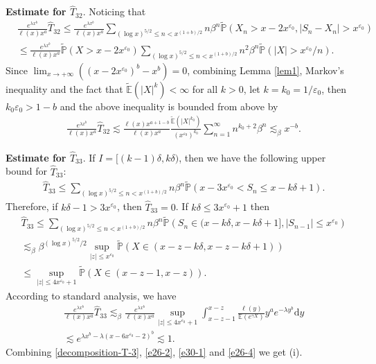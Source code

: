 \documentclass[11pt]{article}
\numberwithin{equation}{section}
\begin{document}
\noindent
{\bf Estimate for $\widehat{T}_{32}$}.  Noticing that 
\begin{align}
	&  \frac{e^{\lambda x^b}}{\ell(x)x^a } \widehat{T}_{32}   \leq \frac{e^{\lambda x^b}}{\ell(x)x^a } \sum_{(\log x)^{5/2}\leq n<x^{(1+b)/2}}  n \beta^{n}\widetilde{\mathbb{P}}\left(X_n > x-2x^{\varepsilon_0}, |S_n-X_n|>x^{\varepsilon_0}\right) \nonumber\\
	& \leq \frac{e^{\lambda x^b}}{\ell(x)x^a } \widetilde{\mathbb{P}}(X>x-2x^{\varepsilon_0}) \sum_{(\log x)^{5/2}\leq n<x^{(1+b)/2}}  n^2 \beta^{n} \widetilde{\mathbb{P}}(|X|>x^{\varepsilon_0}/n).
\end{align}
Since $\lim_{x\to+\infty} ((x-2x^{\varepsilon_0})^b-x^b)=0$, combining Lemma \ref{lem1}, Markov's inequality and the fact that $\widetilde{\mathbb{E}}(|X|^k)<\infty$ for all $k>0$,  let $k=k_0=1/\varepsilon_0$, then $k_0 \varepsilon_0 >1-b$ and the above inequality is bounded from above by
\begin{align}\label{e30-1}
	& \frac{e^{\lambda x^b}}{\ell(x)x^a } \widehat{T}_{32} \lesssim  \frac{\ell(x) x^{a+1-b}}{\ell(x)x^a } \frac{\widetilde{\mathbb{E}}(|X|^{k_0})}{(x^{\varepsilon_0})^{k_0}} \sum_{n=1}^\infty n^{k_0+2} \beta^n \lesssim_\beta  x^{-b}.
\end{align}

\noindent
{\bf Estimate for $\widehat{T}_{33}$}.
If $I=[(k-1)\delta, k\delta)$, then we have the following upper bound for $\widehat{T}_{33}$:
\begin{align}\label{e27-2}
	&  \widehat{T}_{33} \leq   \sum_{(\log x)^{5/2}\leq n<x^{(1+b)/2}}  n \beta^{n} \widetilde{\mathbb{P}}\left(x-3x^{\varepsilon_0}<S_n\leq x-k\delta+1 \right).
\end{align}
Therefore, if $k\delta-1 >3x^{\varepsilon_0}$, then $\widehat{T}_{33} =0$.  If $k\delta\leq 3x^{\varepsilon_0}+1$ then
\begin{align}
	&  \widehat{T}_{33} \leq     \sum_{(\log x)^{5/2}\leq n<x^{(1+b)/2}}  n \beta^{n} \widetilde{\mathbb{P}}\left(S_n\in (x-k\delta, x-k\delta+1],   |S_{n-1}|\leq x^{\varepsilon_0}\right)\nonumber\\
	& \lesssim_\beta   \beta^{(\log x)^{5/2}/2}   \sup_{|z| \leq x^{\varepsilon_0} } \widetilde{\mathbb{P}}(X\in (x-z-k\delta, x-z-k\delta+1))   \nonumber\\
	&\leq \sup_{|z|\leq 4x^{\varepsilon_0} +1} \widetilde{\mathbb{P}}(X\in (x-z-1, x-z)) .
\end{align}
According to standard analysis, we have 
\begin{align}\label{e26-4}
	& \frac{e^{\lambda x^b}}{\ell(x)x^a } \widehat{T}_{33} \lesssim_\beta   \frac{e^{\lambda x^b}}{\ell(x)x^a } \sup_{|z| \leq 4x^{\varepsilon_0} +1}  \int_{x-z-1}^{x-z} \frac{\ell(y)}{\mathbb{E}(e^{\gamma X})} y^a e^{-\lambda y^b}\mathrm{d} y \nonumber\\
	& \lesssim e^{\lambda x^b-\lambda(x-6x^{\varepsilon_0}-2)^b} \lesssim 1 .
\end{align}
Combining \eqref{decomposition-T-3}, \eqref{e26-2}, \eqref{e30-1} and \eqref{e26-4} we get (i).
\end{document}
